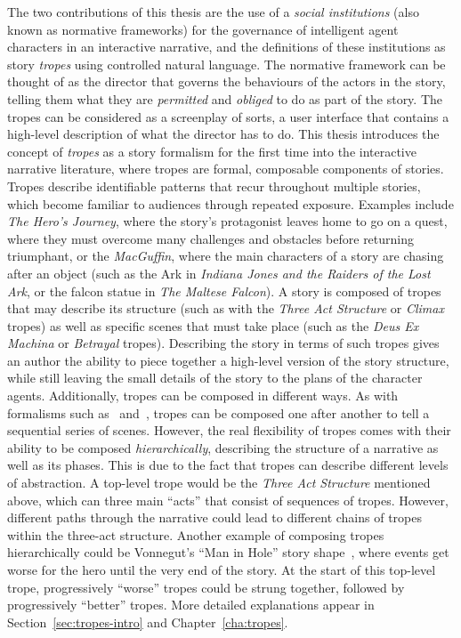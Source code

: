 \documentclass[11pt]{report}
\begin{document}
The two contributions of this thesis are the use of a \emph{social institutions}
(also known as normative frameworks) for the governance of intelligent agent
characters in an interactive narrative, and the definitions of these institutions as story
\emph{tropes} using controlled natural language. The normative framework can be
thought of as the director that governs the behaviours of the actors in the
story, telling them what they are \emph{permitted} and \emph{obliged} to do as
part of the story. The tropes can be considered as a screenplay of sorts, a user interface that contains a high-level description of what
the director has to do. This thesis introduces the concept of \emph{tropes} as a
story formalism for
the first time into the interactive narrative literature, where tropes are formal, composable components
of stories. Tropes describe identifiable patterns that recur throughout multiple
stories, which become familiar to audiences through repeated exposure. Examples
include \emph{The Hero's Journey}, where the story's protagonist leaves home to
go on a quest, where they must overcome many challenges and obstacles before
returning triumphant, or the \emph{MacGuffin}, where the main characters of a
story are chasing after an object (such as the Ark in \emph{Indiana Jones and
  the Raiders of the Lost Ark}, or the falcon statue in \emph{The Maltese
  Falcon}). A story is composed of tropes that may describe its structure (such
as with the \emph{Three Act Structure} or \emph{Climax} tropes) as well as
specific scenes that must take place (such as the \emph{Deus Ex Machina} or
\emph{Betrayal} tropes). Describing the story in terms of such tropes gives an
author the ability to piece together a high-level version of the story
structure, while still leaving the small details of the story to the plans of
the character agents.
Additionally, tropes can be composed in different ways. As with formalisms such
as~\citet{propp1968morphology} and~\citet{lehnert1981plot}, tropes can be
composed one after another to tell a sequential series of scenes. However, the
real flexibility of tropes comes with their ability to be composed
\emph{hierarchically}, describing the structure of a narrative as well as its
phases. This is due to the fact that tropes can describe different levels of
abstraction. A top-level trope would be the \emph{Three Act Structure} mentioned
above, which can three main ``acts'' that consist of sequences of tropes.
However, different paths through the narrative could lead to different chains of
tropes within the three-act structure.
Another example of composing tropes hierarchically could be Vonnegut's ``Man in
Hole'' story shape~\citep{vonnegut2009palm}, where events get worse for the hero
until the very end of the story. At the start of this top-level trope, progressively
``worse'' tropes could be strung together, followed by progressively ``better''
tropes.
More detailed explanations appear in Section~\ref{sec:tropes-intro} and Chapter~\ref{cha:tropes}.
\end{document}
